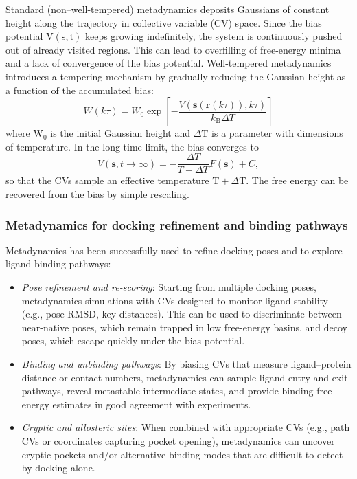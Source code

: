 \documentclass[12pt]{article}
\begin{document}
Standard (non–well-tempered) metadynamics deposits Gaussians of constant height along the trajectory in collective variable (CV) space. Since the bias potential $\textrm{V}(\textrm{s},\textrm{t})$ keeps growing indefinitely, the system is continuously pushed out of already visited regions. This can lead to overfilling of free-energy minima and a lack of convergence of the bias potential. Well-tempered metadynamics\cite{CH9_Barducci2008} introduces a tempering mechanism by gradually reducing the Gaussian height as a function of the accumulated bias:
\begin{equation}
W(k\tau) = W_0 \exp\left[-\frac{V(\mathbf{s}(\mathbf{r}(k\tau)),k\tau)}{k_{\mathrm{B}}\Delta T}\right]
\end{equation}
where $\textrm{W}_\textrm{0}$ is the initial Gaussian height and $\Delta \textrm{T}$ is a parameter with dimensions of temperature. In the long-time limit, the bias converges to
\begin{equation}
V(\mathbf{s}, t\to\infty) = -\frac{\Delta T}{T + \Delta T} F(\mathbf{s}) + C,
\end{equation}
so that the CVs sample an effective temperature $\textrm{T} + \Delta \textrm{T}$. The free energy can be recovered from the bias by simple rescaling.

\subsubsection{Metadynamics for docking refinement and binding pathways}

Metadynamics has been successfully used to refine docking poses and to explore ligand binding pathways:

\begin{itemize}
\item \emph{Pose refinement and re-scoring}: Starting from multiple docking poses, metadynamics simulations with CVs designed to monitor ligand stability (e.g., pose RMSD, key distances). This can be used to discriminate between near-native poses, which remain trapped in low free-energy basins, and decoy poses, which escape quickly under the bias potential\cite{CH9_clark2016}.
\item \emph{Binding and unbinding pathways}: By biasing CVs that measure ligand--protein distance or contact numbers, metadynamics can sample ligand entry and exit pathways, reveal metastable intermediate states, and provide binding free energy estimates in good agreement with experiments\cite{CH9_Tiwary2015,CH9_Callea2021}.
\item \emph{Cryptic and allosteric sites}: When combined with appropriate CVs (e.g., path CVs or coordinates capturing pocket opening), metadynamics can uncover cryptic pockets and/or alternative binding modes that are difficult to detect by docking alone.
\end{itemize}
\end{document}
